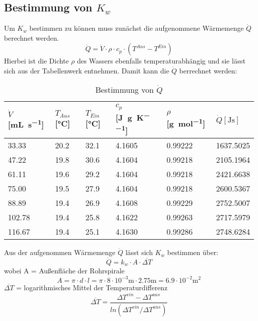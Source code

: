 \documentclass{article}
\begin{document}
\subsection{Bestimmung von $K _w$}
Um $K _w$ bestimmen zu können muss zunächst die aufgenommene Wärmemenge $\dot Q$ berechnet werden.
\begin{equation}
  \dot Q = \dot V \cdot \rho \cdot c _p \cdot (T^{Aus}-T^{Ein})
\end{equation}
Hierbei ist die Dichte $\rho$ des Wassers ebenfalls temperaturabhängig und sie lässt sich aus der Tabellenwerk \cite{crc3} entnehmen.
Damit kann die $\dot Q$ berrechnet werden:
\begin{table}[ht!]
  \centering
 \begin{tabularx}{\textwidth}{XXXXXX}
 $\dot V$ [\si{\milli\liter\per\second}] & $T _{Aus}$ [\si{\celsius}] &  $T _{Ein}$ [\si{\celsius}] & $c _p$ [\si{\joule\per\gram\per\kelvin}]
 & $\rho$ [\si{\gram\per\mol}] & $\dot Q [\si{\joule\second}] $\\
\hline
\rowcolor{LightCyan}
33.33  & 20.2 & 32.1 & 4.1605 & 0.99222 &1637.5025 \\
47.22  & 19.8 & 30.6 & 4.1604 & 0.99218 &2105.1964 \\
61.11  & 19.6 & 29.2 & 4.1604 & 0.99218 &2421.6638 \\
75.00  & 19.5 & 27.9 & 4.1604 & 0.99218 &2600.5367 \\
88.89  & 19.4 & 26.9 & 4.1608 & 0.99229 &2752.5007 \\
102.78 & 19.4 & 25.8 & 4.1622 & 0.99263 &2717.5979 \\
116.67 & 19.4 & 25.1 & 4.1630 & 0.99286 &2748.6284 \\
\end{tabularx}
  \caption{Bestimmung von $\dot Q$}
\end{table}
Aus der aufgenommen Wärmemenge $\dot Q$ lässt sich $K _w$ bestimmen über:
\begin{equation}
  \dot Q = k _w \cdot A \cdot \overline{\Delta T}
\end{equation}
wobei A = Außenfläche der Rohrspirale
 \begin{equation}
   A = \pi \cdot d \cdot l = \pi \cdot 8 \cdot 10^{-3} \si{\meter} \cdot 2.75 \si{\meter} = 6.9 \cdot 10^{-2} \si{\square\meter}
 \end{equation}
 $ \overline{\Delta T}$ = logarithmisches Mittel der Temperaturdifferenz
 \begin{equation}
   \overline{\Delta T} = \frac{\Delta T^{ein}-\Delta T^{aus}}{ln(\Delta T^{ein}/\Delta T^{aus})}
 \end{equation}
\end{document}
